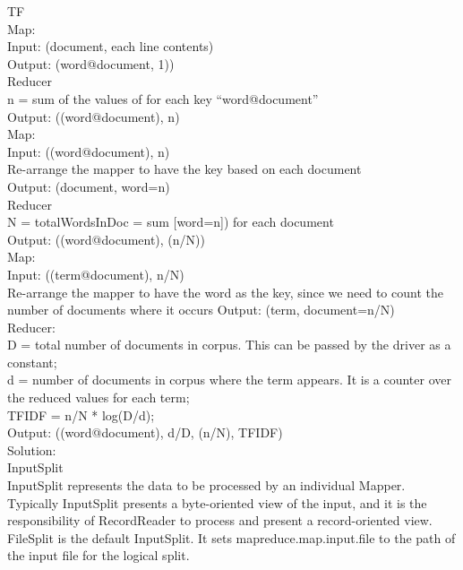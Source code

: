\documentclass{bigdata}
\newcommand\tab[1][1cm]{\hspace*{#1}}
\begin{document}
TF\\
\tab    Map:\\
\tab \tab       Input: (document, each line contents)\\
\tab \tab       Output: (word@document, 1))\\
\tab    Reducer\\
\tab \tab      n = sum of the values of for each key “word@document”\\
\tab \tab       Output: ((word@document), n)\\
\tab    Map:\\
\tab \tab        Input: ((word@document), n)\\
\tab \tab Re-arrange the mapper to have the key based on each document\\
\tab \tab        Output: (document, word=n)\\
\tab   Reducer\\
\tab \tab        N = totalWordsInDoc = sum [word=n]) for each document\\
\tab \tab        Output: ((word@document), (n/N))\\
\tab     Map:\\
\tab \tab        Input: ((term@document), n/N)\\
\tab \tab        Re-arrange the mapper to have the word as the key, since we need to count \tab \tab the number of documents where it occurs
\tab \tab        Output: (term, document=n/N)\\
\tab   Reducer:\\
\tab \tab        D = total number of documents in corpus. This can be passed by the driver \tab \tab as a constant;\\
\tab \tab        d = number of documents in corpus where the term appears. It is a counter  \tab \tab over the reduced values for each term;\\
\tab \tab        TFIDF = n/N * log(D/d);\\
\tab \tab        Output: ((word@document), d/D, (n/N), TFIDF)\\
Solution:\\
InputSplit\\
InputSplit represents the data to be processed by an individual Mapper.
Typically InputSplit presents a byte-oriented view of the input, and it is the responsibility of RecordReader to process and present a record-oriented view.
FileSplit is the default InputSplit. It sets mapreduce.map.input.file to the path of the input file for the logical split.\\
\end{document}
